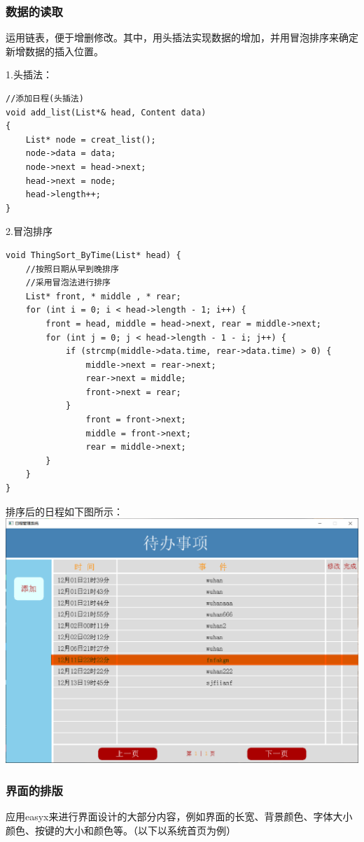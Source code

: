\documentclass[UTF8]{article}
\begin{document}
\subsubsection{数据的读取}

运用链表，便于增删修改。其中，用头插法实现数据的增加，并用冒泡排序来确定新增数据的插入位置。

1.头插法：
\begin{verbatim}
//添加日程(头插法)
void add_list(List*& head, Content data)
{
    List* node = creat_list();
    node->data = data;
    node->next = head->next;
    head->next = node;
    head->length++;
}
\end{verbatim}
2.冒泡排序
\begin{verbatim}
void ThingSort_ByTime(List* head) {
    //按照日期从早到晚排序
    //采用冒泡法进行排序
    List* front, * middle , * rear;
    for (int i = 0; i < head->length - 1; i++) {
        front = head, middle = head->next, rear = middle->next;
        for (int j = 0; j < head->length - 1 - i; j++) {
            if (strcmp(middle->data.time, rear->data.time) > 0) {
                middle->next = rear->next;
                rear->next = middle;
                front->next = rear;
            }
                front = front->next;
                middle = front->next;
                rear = middle->next;
        }
    }
}
\end{verbatim}
排序后的日程如下图所示：\\
\includegraphics[width=.8\textwidth]{1.1.png}

\subsubsection{界面的排版}

应用easyx来进行界面设计的大部分内容，例如界面的长宽、背景颜色、字体大小颜色、按键的大小和颜色等。（以下以系统首页为例）
\end{document}
